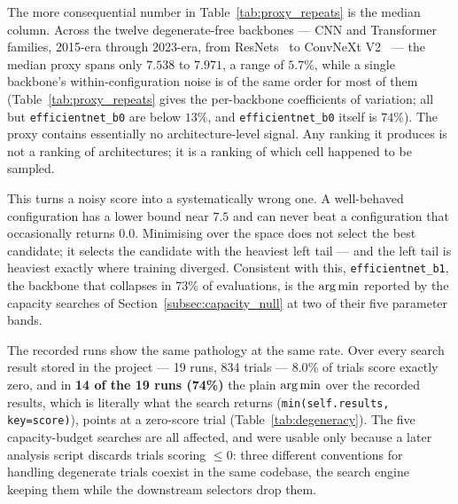 The more consequential number in Table~\ref{tab:proxy_repeats} is the median
column. Across the twelve degenerate-free backbones --- CNN and Transformer
families, 2015-era through 2023-era, from ResNets~\cite{he2016deep} to ConvNeXt
V2~\cite{woo2023convnextv2} --- the median proxy spans only $7.538$ to $7.971$, a
range of $5.7\%$, while a single backbone's within-configuration noise is of the
same order for most of them (Table~\ref{tab:proxy_repeats} gives the
per-backbone coefficients of variation; all but \texttt{efficientnet\_b0} are
below $13\%$, and \texttt{efficientnet\_b0} itself is $74\%$). The proxy contains
essentially no
architecture-level signal. Any ranking it produces is not a ranking of
architectures; it is a ranking of which cell happened to be sampled.

This turns a noisy score into a systematically wrong one. A well-behaved
configuration has a lower bound near $7.5$ and can never beat a configuration
that occasionally returns $0.0$. Minimising over the space does not select the
best candidate; it selects the candidate with the heaviest left tail --- and the
left tail is heaviest exactly where training diverged. Consistent with this,
\texttt{efficientnet\_b1}, the backbone that collapses in $73\%$ of evaluations,
is the $\operatorname*{arg\,min}$ reported by the capacity searches of
Section~\ref{subsec:capacity_null} at two of their five parameter bands.

The recorded runs show the same pathology at the same rate. Over every search
result stored in the project --- 19 runs, 834 trials --- $8.0\%$ of trials score
exactly zero, and in \textbf{14 of the 19 runs (74\%)} the plain $\operatorname*{arg\,min}$ over
the recorded results, which is literally what the search returns
(\texttt{min(self.results, key=score)}), points at a zero-score trial
(Table~\ref{tab:degeneracy}). The five capacity-budget searches are all affected,
and were usable only because a later analysis script discards trials scoring
$\le 0$: three different conventions for handling degenerate trials coexist in the
same codebase, the search engine keeping them while the downstream selectors drop
them.

